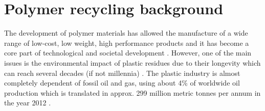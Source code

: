 	
	
	
	
	
	
	
	
	
	
	



\section{Polymer recycling background}
\label{Chap-3:Polymer.Recycling.Background}
The development of polymer materials has allowed the manufacture of a wide range of low-cost, low weight, high performance products and it has become a core part of technological and societal development \parencite{Andrady2009}.
However, one of the main issues is the environmental impact of plastic residues due to their longevity which can reach several decades (if not millennia) \parencite{Hopewell2009}. 
The plastic industry is almost completely dependent of fossil oil and gas, using about 4\% of worldwide oil production which is translated in approx. 299 million metric tonnes per annum in the year 2012 \parencite{Plastics2014, Plastics2016}.  



